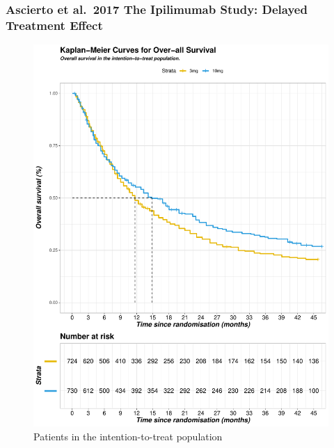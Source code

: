 \documentclass[12pt,twoside]{reedthesis}
\begin{document}
\hypertarget{ascierto-et-al.-2017-the-ipilimumab-study-delayed-treatment-effect}{%
\subsubsection{Ascierto et al.~2017 The Ipilimumab Study: Delayed Treatment Effect}\label{ascierto-et-al.-2017-the-ipilimumab-study-delayed-treatment-effect}}
\begin{figure}

{\centering \includegraphics[scale=0.55]{figure/ascierto} 

}

\caption{Patients in the intention-to-treat population}\label{fig:unnamed-chunk-11}
\end{figure}
\clearpage
\end{document}
